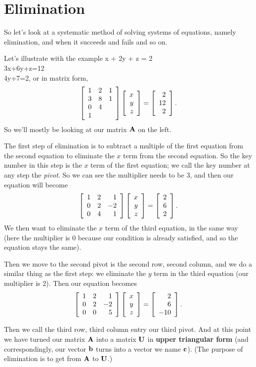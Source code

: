 \section{Elimination}

So let's look at a systematic method of solving systems of equations, namely elimination, and when it succeeds and fails and so on.

\bex
Let's illustrate with the example
\bea
x + 2y + z = 2 \\ 3x+6y+z=12\\4y+7=2,
\eea
or in matrix form,
\[ \left[ \begin{array}{rrrrrrrrrrrrrrrrrrrrrrrrr} 1&2&1\\3&8&1\\0&4\\1\\ \end{array} \right]\left[ \begin{array}{rrrrrrrrrrrrrrrrrrrrrrrrr} x\\y\\z\\ \end{array} \right] = \left[ \begin{array}{rrrrrrrrrrrrrrrrrrrrrrrrr} 2\\12\\2\\ \end{array} \right]. \]
So we'll mostly be looking at our matrix $\boldsymbol{\mathbf{A}}$ on the left.

The first step of elimination is to subtract a multiple of the first equation from the second equation to eliminate the $x$ term from the second equation. So the key number in this step is the $x$ term of the first equation; we call the key number at any step the \textit{pivot}. So we can see the multiplier needs to be 3, and then our equation will become
\[ \left[ \begin{array}{rrrrrrrrrrrrrrrrrrrrrrrrr} 1&2&1\\0&2&-2\\0&4&1\\ \end{array} \right]\left[ \begin{array}{rrrrrrrrrrrrrrrrrrrrrrrrr} x\\y\\z\\ \end{array} \right] = \left[ \begin{array}{rrrrrrrrrrrrrrrrrrrrrrrrr} 2\\6\\2\\ \end{array} \right]. \]
We then want to eliminate the $x$ term of the third equation, in the same way (here the multiplier is 0 because our condition is already satisfied, and so the equation stays the same). 

Then we move to the second pivot is the second row, second column, and we do a similar thing as the first step: we eliminate the $y$ term in the third equation (our multiplier is 2). Then our equation becomes
\[ \left[ \begin{array}{rrrrrrrrrrrrrrrrrrrrrrrrr} 1&2&1\\0&2&-2\\0&0&5\\ \end{array} \right]\left[ \begin{array}{rrrrrrrrrrrrrrrrrrrrrrrrr} x\\y\\z\\ \end{array} \right] = \left[ \begin{array}{rrrrrrrrrrrrrrrrrrrrrrrrr} 2\\6\\-10\\ \end{array} \right]. \]

Then we call the third row, third column entry our third pivot. And at this point we have turned our matrix $\boldsymbol{\mathbf{A}}$ into a matrix $\boldsymbol{\mathbf{U}}$ in \textbf{upper triangular form} (and correspondingly, our vector $\boldsymbol{\mathbf{b}}$ turns into a vector we name $\boldsymbol{\mathbf{c}}$). (The purpose of elimination is to get from $\boldsymbol{\mathbf{A}}$ to $\boldsymbol{\mathbf{U}}$.)


